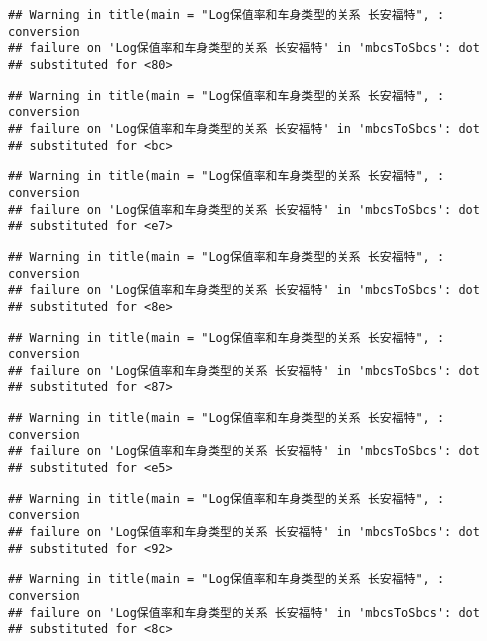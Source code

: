 \documentclass[]{article}
\begin{document}
\begin{verbatim}
## Warning in title(main = "Log保值率和车身类型的关系 长安福特", : conversion
## failure on 'Log保值率和车身类型的关系 长安福特' in 'mbcsToSbcs': dot
## substituted for <80>
\end{verbatim}

\begin{verbatim}
## Warning in title(main = "Log保值率和车身类型的关系 长安福特", : conversion
## failure on 'Log保值率和车身类型的关系 长安福特' in 'mbcsToSbcs': dot
## substituted for <bc>
\end{verbatim}

\begin{verbatim}
## Warning in title(main = "Log保值率和车身类型的关系 长安福特", : conversion
## failure on 'Log保值率和车身类型的关系 长安福特' in 'mbcsToSbcs': dot
## substituted for <e7>
\end{verbatim}

\begin{verbatim}
## Warning in title(main = "Log保值率和车身类型的关系 长安福特", : conversion
## failure on 'Log保值率和车身类型的关系 长安福特' in 'mbcsToSbcs': dot
## substituted for <8e>
\end{verbatim}

\begin{verbatim}
## Warning in title(main = "Log保值率和车身类型的关系 长安福特", : conversion
## failure on 'Log保值率和车身类型的关系 长安福特' in 'mbcsToSbcs': dot
## substituted for <87>
\end{verbatim}

\begin{verbatim}
## Warning in title(main = "Log保值率和车身类型的关系 长安福特", : conversion
## failure on 'Log保值率和车身类型的关系 长安福特' in 'mbcsToSbcs': dot
## substituted for <e5>
\end{verbatim}

\begin{verbatim}
## Warning in title(main = "Log保值率和车身类型的关系 长安福特", : conversion
## failure on 'Log保值率和车身类型的关系 长安福特' in 'mbcsToSbcs': dot
## substituted for <92>
\end{verbatim}

\begin{verbatim}
## Warning in title(main = "Log保值率和车身类型的关系 长安福特", : conversion
## failure on 'Log保值率和车身类型的关系 长安福特' in 'mbcsToSbcs': dot
## substituted for <8c>
\end{verbatim}
\end{document}
